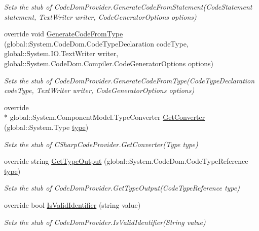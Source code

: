 \begin{DoxyCompactItemize}
\begin{DoxyCompactList}\small\item\em Sets the stub of Code\-Dom\-Provider.\-Generate\-Code\-From\-Statement(\-Code\-Statement statement, Text\-Writer writer, Code\-Generator\-Options options)\end{DoxyCompactList}\item 
override void \hyperlink{class_microsoft_1_1_c_sharp_1_1_fakes_1_1_stub_c_sharp_code_provider_a52c2e3d2a3e74255b0f1ef58601a0b4f}{Generate\-Code\-From\-Type} (global\-::\-System.\-Code\-Dom.\-Code\-Type\-Declaration code\-Type, global\-::\-System.\-I\-O.\-Text\-Writer writer, global\-::\-System.\-Code\-Dom.\-Compiler.\-Code\-Generator\-Options options)
\begin{DoxyCompactList}\small\item\em Sets the stub of Code\-Dom\-Provider.\-Generate\-Code\-From\-Type(\-Code\-Type\-Declaration code\-Type, Text\-Writer writer, Code\-Generator\-Options options)\end{DoxyCompactList}\item 
override \\*
global\-::\-System.\-Component\-Model.\-Type\-Converter \hyperlink{class_microsoft_1_1_c_sharp_1_1_fakes_1_1_stub_c_sharp_code_provider_a93299b9cc468fd8902d1f7e95b91e049}{Get\-Converter} (global\-::\-System.\-Type \hyperlink{jquery-1_810_82-vsdoc_8js_a3940565e83a9bfd10d95ffd27536da91}{type})
\begin{DoxyCompactList}\small\item\em Sets the stub of C\-Sharp\-Code\-Provider.\-Get\-Converter(\-Type type)\end{DoxyCompactList}\item 
override string \hyperlink{class_microsoft_1_1_c_sharp_1_1_fakes_1_1_stub_c_sharp_code_provider_a1c856e804a2a807e9c2e99003294fdb9}{Get\-Type\-Output} (global\-::\-System.\-Code\-Dom.\-Code\-Type\-Reference \hyperlink{jquery-1_810_82-vsdoc_8js_a3940565e83a9bfd10d95ffd27536da91}{type})
\begin{DoxyCompactList}\small\item\em Sets the stub of Code\-Dom\-Provider.\-Get\-Type\-Output(\-Code\-Type\-Reference type)\end{DoxyCompactList}\item 
override bool \hyperlink{class_microsoft_1_1_c_sharp_1_1_fakes_1_1_stub_c_sharp_code_provider_a4112cbca3c7240fe5a1ef53725b4c93a}{Is\-Valid\-Identifier} (string value)
\begin{DoxyCompactList}\small\item\em Sets the stub of Code\-Dom\-Provider.\-Is\-Valid\-Identifier(\-String value)\end{DoxyCompactList}\item 

\end{DoxyCompactItemize}

